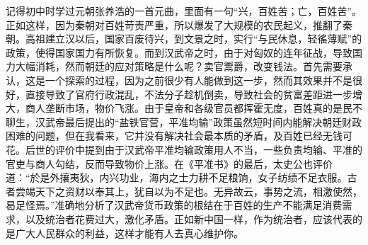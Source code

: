 \documentclass[12pt,a4paper]{ctexart}
\begin{document}
记得初中时学过元朝张养浩的一首元曲，里面有一句“兴，百姓苦；亡，百姓苦”。正如这样，因为秦朝对百姓苛责严重，所以爆发了大规模的农民起义，推翻了秦朝。高祖建立汉以后，国家百废待兴，到文景之时，实行“与民休息，轻徭薄赋”的政策，使得国家国力有所恢复。而到汉武帝之时，由于对匈奴的连年征战，导致国力大幅消耗，然而朝廷的应对策略是什么呢？卖官鬻爵，改变钱法。首先需要承认，这是一个探索的过程，因为之前很少有人能做到这一步，然而其效果并不是很好，直接导致了官府行政混乱，不法分子趁机倒卖，导致社会的贫富差距进一步增大，商人垄断市场，物价飞涨。由于皇帝和各级官员都挥霍无度，百姓真的是民不聊生，汉武帝最后提出的“盐铁官营，平准均输”政策虽然短时间内能解决朝廷财政困难的问题，但在我看来，它并没有解决社会最本质的矛盾，及百姓已经无钱可花。后世的评价中提到由于汉武帝平准均输政策用人不当，一些负责均输、平准的官吏与商人勾结，反而导致物价上涨。在《平准书》的最后，太史公也评价道：“於是外攘夷狄，内兴功业，海内之士力耕不足粮饷，女子纺绩不足衣服。古者尝竭天下之资财以奉其上，犹自以为不足也。无异故云，事势之流，相激使然，曷足怪焉。”准确地分析了汉武帝货币政策的根结在于百姓的生产不能满足消费需求，以及统治者花费过大，激化矛盾。正如新中国一样，作为统治者，应该代表的是广大人民群众的利益，这样才能有人去真心维护你。
\end{document}
